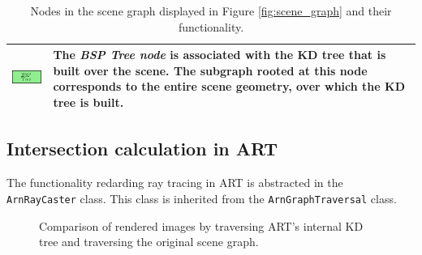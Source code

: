 \begin{table}
{\begin{tabular}{m{3cm}m{8cm}}
      \midrule
     \includegraphics[scale=0.5]{img/2 art/bsp_node.png} & The \emph{BSP Tree node} is associated with the KD tree that is built over the scene. The subgraph rooted at this node corresponds to the entire scene geometry, over which the KD tree is built.
      \\
      \bottomrule
    \end{tabular}}
  \caption{Nodes in the scene graph displayed in Figure \ref{fig:scene_graph} and their functionality.}
  \label{tab:nodes}
\end{table}


\subsection{Intersection calculation in ART}
\label{sec:art_raytracing}
The functionality redarding ray tracing in ART is abstracted in the \texttt{ArnRayCaster} class. This class is inherited from the \texttt{ArnGraphTraversal} class. 




\begin{figure}[!tbp]
	\centering
	\hfil
	\caption{Comparison of rendered images by traversing ART's internal KD tree and traversing the original scene graph.}
	\label{fig:org_scenegraph}
\end{figure}




